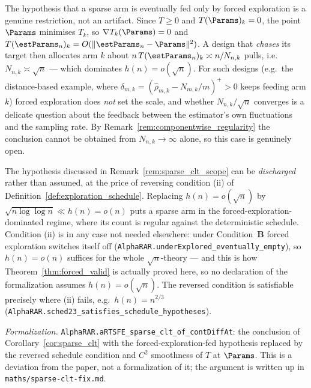 \begin{remark}\label{rem:sparse_clt_scope}
The hypothesis that a sparse arm is eventually fed only by forced exploration is a genuine
restriction, not an artifact. Since $T\ge0$ and $T(\Params)_k=0$, the point $\Params$ minimises
$T_k$, so $\nabla T_k(\Params)=0$ and $T(\estParams_n)_k=O(\|\estParams_n-\Params\|^2)$. A design
that \emph{chases} its target then allocates arm $k$ about $n\,T(\estParams_n)_k\asymp n/N_{n,k}$
pulls, i.e.\ $N_{n,k}\asymp\sqrt n$ --- which dominates $h(n)=o(\sqrt n)$. For such designs (e.g.\ the
distance-based example, where $\delta_{m,k}=(\hat\rho_{m,k}-N_{m,k}/m)^+>0$ keeps feeding arm $k$)
forced exploration does \emph{not} set the scale, and whether $N_{n,k}/\sqrt n$ converges is a
delicate question about the feedback between the estimator's own fluctuations and the sampling rate.
By Remark~\ref{rem:componentwise_regularity} the conclusion cannot be obtained from
$N_{n,k}\to\infty$ alone, so this case is genuinely open.
\end{remark}

\begin{remark}\label{rem:sparse_clt_fix}
The hypothesis discussed in Remark~\ref{rem:sparse_clt_scope} can be \emph{discharged} rather than
assumed, at the price of reversing condition (ii) of Definition~\ref{def:exploration_schedule}.
Replacing $h(n)=o(\sqrt n)$ by $\sqrt{n\log\log n}\ll h(n)=o(n)$ puts a sparse arm in the
forced-exploration-dominated regime, where its count is regular against the deterministic schedule.
Condition (ii) is in any case not needed elsewhere: under Condition~\textbf{B} forced exploration
switches itself off (\texttt{AlphaRAR.underExplored\_eventually\_empty}), so $h(n)=o(n)$ suffices for
the whole $\sqrt n$-theory --- and this is how Theorem~\ref{thm:forced_valid} is actually proved
here, so no declaration of the formalization assumes $h(n)=o(\sqrt n)$. The reversed condition is satisfiable precisely where (ii) fails, e.g.\
$h(n)=n^{2/3}$ (\texttt{AlphaRAR.sched23\_satisfies\_schedule\_hypotheses}).

\emph{Formalization.} \texttt{AlphaRAR.aRTSFE\_sparse\_clt\_of\_contDiffAt}: the conclusion of
Corollary~\ref{cor:sparse_clt} with the forced-exploration-fed hypothesis replaced by the reversed
schedule condition and $C^2$ smoothness of $T$ at $\Params$. This is a deviation from the paper, not
a formalization of it; the argument is written up in \texttt{maths/sparse-clt-fix.md}.
\end{remark}

